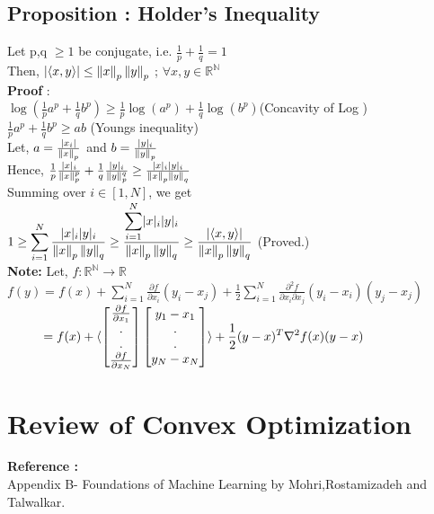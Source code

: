 \documentclass[a4paper,english,12pt]{article}
\newcommand\tab[1][1cm]{\hspace*{#1}}
\begin{document}
\subsection{Proposition : Holder's Inequality} 
Let p,q $\geq 1$ be conjugate, i.e.  $\frac{1}{p} + \frac{1}{q} =1 $\\
Then, \tab $\lvert\langle x,y\rangle\rvert \leq \left\lVert x\right\rVert_p \left\lVert y\right\rVert_p$ ; $\forall x,y \in \mathbb{R^N}$\\
\textbf{Proof} :\\
$\log(\frac{1}{p}a^p + \frac{1}{q}b^p) \geq \frac{1}{p}\log(a^p) + \frac{1}{q}\log(b^p)$\tab(Concavity of Log )\\
$\frac{1}{p}a^p + \frac{1}{q}b^p\geq ab$ \tab(Youngs inequality)\\

Let, $a = \frac{\lvert x_{i}\rvert}{\left\lVert x\right\rVert_{p}}$ and $b = \frac{\lvert y\rvert_{i}}{\left\lVert y\right\rVert_{p}} $\\ 
Hence,  \tab $\frac{1}{p} \frac{\lvert x\rvert_{i}}{\left\lVert x\right\rVert_{p}^p} + \frac{1}{q} \frac{\lvert y\rvert_{i}}{\left\lVert y\right\rVert_{p}^q} \geq \frac{\lvert x\rvert_i\lvert y\rvert_i}{\left\lVert x\right\rVert_p\left\lVert y\right\rVert_q}$\\
Summing over $i\in[1,N]$,  we get\\
$1 \geq \displaystyle{\sum_{i=1}^{N} \frac{\lvert x\rvert_i\lvert y\rvert_i}{\left\lVert x\right\rVert_p\left\lVert y\right\rVert_q}}  \geq \frac{\displaystyle{\sum_{i=1}^{N} \lvert x\rvert_i\lvert y\rvert_i}}{\left\lVert x\right\rVert_p\left\lVert y\right\rVert_q} \geq \frac{\lvert\langle x,y \rangle\rvert}{\left\lVert x\right\rVert_p\left\lVert y\right\rVert_q}$ (Proved.)\\
\textbf{Note:} Let, $f:\mathbb{R^N}\rightarrow\mathbb{R}$\\
$f(y) = f(x) + \displaystyle{\sum_{i=1}^{N} \frac{\partial f}{\partial x_i}(y_i - x_j) + \frac{1}{2}\sum_{i=1}^{N} \frac{\partial^2 f}{\partial x_i \partial x_j}(y_i - x_i)(y_j - x_j)}$\\
$\tab=f(x) + \displaystyle{\langle\begin{bmatrix} \frac{\partial f}{\partial x_1} \\. \\ . \\  \frac{\partial f}{\partial x_N}\end{bmatrix} \begin{bmatrix} {y_1 - x_1} \\. \\ . \\  {y_{N} - x_{N}}\end{bmatrix}\rangle} + \frac{1}{2}(y-x)^T \nabla^2 f(x) (y-x)$\\
\section{Review of Convex Optimization}
\textbf{Reference :}\\
Appendix B- Foundations of Machine Learning by Mohri,Rostamizadeh and Talwalkar.
\end{document}
